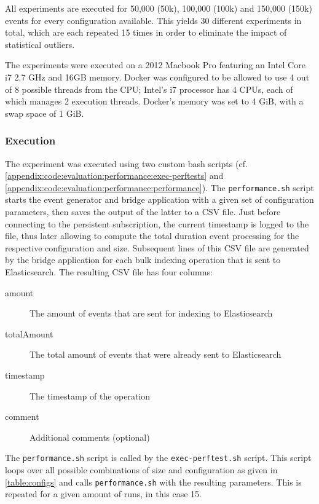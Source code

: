 All experiments are executed for 50,000 (50k), 100,000 (100k) and 150,000 (150k) events for every configuration available.
This yields 30 different experiments in total, which are each repeated 15 times in order to eliminate the impact of statistical outliers.

The experiments were executed on a 2012 Macbook Pro featuring an Intel Core i7 2.7 GHz and 16GB memory.
Docker was configured to be allowed to use 4 out of 8 possible threads from the CPU; Intel's i7 processor has 4 CPUs, each of which manages 2 execution threads.
Docker's memory was set to 4 GiB, with a swap space of 1 GiB.

\subsubsection{Execution}

The experiment was executed using two custom bash scripts (cf. \cref{appendix:code:evaluation:performance:exec-perftests} and \cref{appendix:code:evaluation:performance:performance}).
The \texttt{performance.sh} script starts the event generator and bridge application with a given set of configuration parameters, then saves the output of the latter to a CSV file.
Just before connecting to the persistent subscription, the current timestamp is logged to the file, thus later allowing to compute the total duration event processing for the respective configuration and size.
Subsequent lines of this CSV file are generated by the bridge application for each bulk indexing operation that is sent to Elasticsearch.
The resulting CSV file has four columns:

\begin{description}
\item[amount] The amount of events that are sent for indexing to Elasticsearch
\item[totalAmount] The total amount of events that were already sent to Elasticsearch
\item[timestamp] The timestamp of the operation
\item[comment] Additional comments (optional)
\end{description}

The \texttt{performance.sh} script is called by the \texttt{exec-perftest.sh} script.
This script loops over all possible combinations of size and configuration as given in \cref{table:configs} and calls \texttt{performance.sh} with the resulting parameters.
This is repeated for a given amount of runs, in this case 15.

